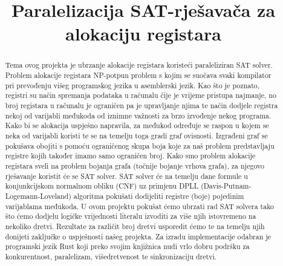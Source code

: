 \documentclass[hidelinks, conference]{IEEEtran}
\begin{document}

\title{Paralelizacija SAT-rješavača za alokaciju registara\\
}

\author{
\and
{}
\and
{}
\and
{}
\and
{}
}

\maketitle

\begin{abstract}
Tema ovog projekta je ubrzanje alokacije registara koristeći paraleliziran SAT solver. Problem alokacije registara NP-potpun problem s kojim se suočava svaki kompilator pri prevođenju višeg programskog jezika u asemblerski jezik. Kao što je poznato, registri su način spremanja podataka u računalu čije je vrijeme pristupa najmanje, no broj registara u računalu je ograničen pa je upravljanje njima te način dodjele registra nekoj od varijabli međukoda od iznimne važnosti za brzo izvođenje nekog programa. Kako bi se alokacija uspješno napravila, za međukod određuje se raspon u kojem se neka od varijabli koristi te se na temelju toga gradi graf ovisnosti. Izgrađeni graf se pokušava obojiti s pomoću ograničenog skupa boja koje za naš problem predstavljaju registre kojih također imamo samo ograničen broj. Kako smo problem alokacije registara sveli na problem bojanja grafa (točnije bojanje vrhova grafa), za njegovo rješavanje koristit će se SAT solver. SAT solver će na temelju dane formule u konjunkcijskom normalnom obliku (CNF) uz primjenu DPLL (Davis-Putnam-Logemann-Loveland) algoritma pokušati dodijeliti registre (boje) pojedinim varijablama međukoda. U ovom projektu pokušat ćemo ubrzati rad SAT solvera tako što ćemo dodjelu logičke vrijednosti literalu izvoditi za više njih istovremeno na nekoliko dretvi. Rezultate za različit broj dretvi usporedit ćemo te na temelju njih donijeti zaključke o uspješnosti našeg projekta. Za izradu implementacije odabran je programski jezik Rust koji preko svojim knjižnica nudi vrlo dobru podršku za konkurentnost, paralelizam, višedretvenost te sinkronizaciju dretvi.
\end{abstract}
\end{document}
